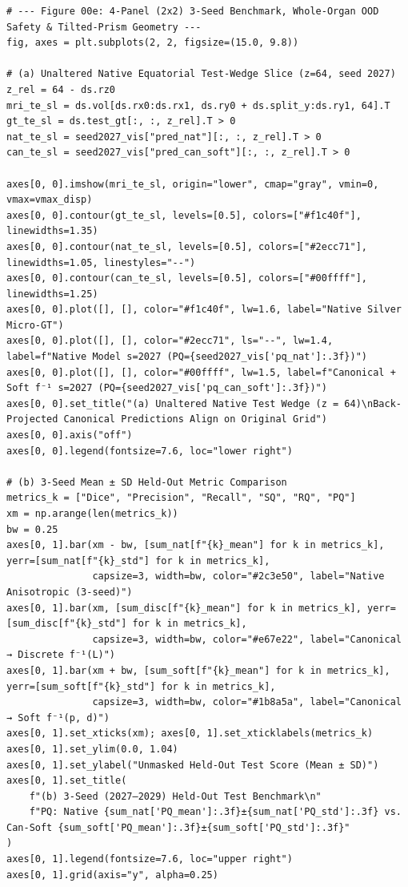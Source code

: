 \documentclass[10pt,a4paper]{article}
\renewcommand{\_}{\origunderscore\allowbreak}
\begin{document}
\begin{codebox}
\begin{lstlisting}[style=pybmed]
# --- Figure 00e: 4-Panel (2x2) 3-Seed Benchmark, Whole-Organ OOD Safety & Tilted-Prism Geometry ---
fig, axes = plt.subplots(2, 2, figsize=(15.0, 9.8))

# (a) Unaltered Native Equatorial Test-Wedge Slice (z=64, seed 2027)
z_rel = 64 - ds.rz0
mri_te_sl = ds.vol[ds.rx0:ds.rx1, ds.ry0 + ds.split_y:ds.ry1, 64].T
gt_te_sl = ds.test_gt[:, :, z_rel].T > 0
nat_te_sl = seed2027_vis["pred_nat"][:, :, z_rel].T > 0
can_te_sl = seed2027_vis["pred_can_soft"][:, :, z_rel].T > 0

axes[0, 0].imshow(mri_te_sl, origin="lower", cmap="gray", vmin=0, vmax=vmax_disp)
axes[0, 0].contour(gt_te_sl, levels=[0.5], colors=["#f1c40f"], linewidths=1.35)
axes[0, 0].contour(nat_te_sl, levels=[0.5], colors=["#2ecc71"], linewidths=1.05, linestyles="--")
axes[0, 0].contour(can_te_sl, levels=[0.5], colors=["#00ffff"], linewidths=1.25)
axes[0, 0].plot([], [], color="#f1c40f", lw=1.6, label="Native Silver Micro-GT")
axes[0, 0].plot([], [], color="#2ecc71", ls="--", lw=1.4, label=f"Native Model s=2027 (PQ={seed2027_vis['pq_nat']:.3f})")
axes[0, 0].plot([], [], color="#00ffff", lw=1.5, label=f"Canonical + Soft f⁻¹ s=2027 (PQ={seed2027_vis['pq_can_soft']:.3f})")
axes[0, 0].set_title("(a) Unaltered Native Test Wedge (z = 64)\nBack-Projected Canonical Predictions Align on Original Grid")
axes[0, 0].axis("off")
axes[0, 0].legend(fontsize=7.6, loc="lower right")

# (b) 3-Seed Mean ± SD Held-Out Metric Comparison
metrics_k = ["Dice", "Precision", "Recall", "SQ", "RQ", "PQ"]
xm = np.arange(len(metrics_k))
bw = 0.25
axes[0, 1].bar(xm - bw, [sum_nat[f"{k}_mean"] for k in metrics_k], yerr=[sum_nat[f"{k}_std"] for k in metrics_k],
               capsize=3, width=bw, color="#2c3e50", label="Native Anisotropic (3-seed)")
axes[0, 1].bar(xm, [sum_disc[f"{k}_mean"] for k in metrics_k], yerr=[sum_disc[f"{k}_std"] for k in metrics_k],
               capsize=3, width=bw, color="#e67e22", label="Canonical → Discrete f⁻¹(L)")
axes[0, 1].bar(xm + bw, [sum_soft[f"{k}_mean"] for k in metrics_k], yerr=[sum_soft[f"{k}_std"] for k in metrics_k],
               capsize=3, width=bw, color="#1b8a5a", label="Canonical → Soft f⁻¹(p, d)")
axes[0, 1].set_xticks(xm); axes[0, 1].set_xticklabels(metrics_k)
axes[0, 1].set_ylim(0.0, 1.04)
axes[0, 1].set_ylabel("Unmasked Held-Out Test Score (Mean ± SD)")
axes[0, 1].set_title(
    f"(b) 3-Seed (2027–2029) Held-Out Test Benchmark\n"
    f"PQ: Native {sum_nat['PQ_mean']:.3f}±{sum_nat['PQ_std']:.3f} vs. Can-Soft {sum_soft['PQ_mean']:.3f}±{sum_soft['PQ_std']:.3f}"
)
axes[0, 1].legend(fontsize=7.6, loc="upper right")
axes[0, 1].grid(axis="y", alpha=0.25)


\end{lstlisting}
\end{codebox}
\end{document}
